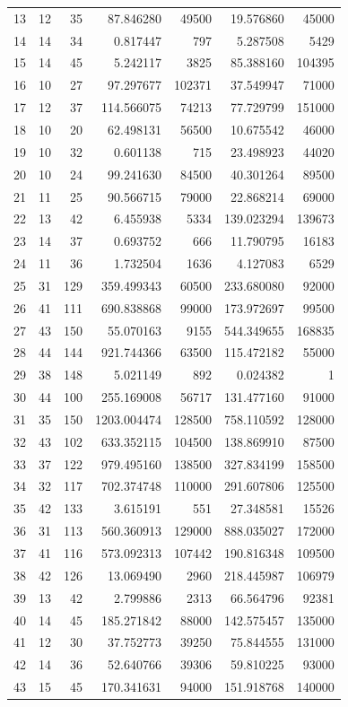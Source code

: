 \documentclass{article}
\begin{document}
\begin{landscape}
\begin{longtable}{rrrrrrr}
13 & 12 & 35 & 87.846280 & 49500 & 19.576860 & 45000 \\
14 & 14 & 34 & 0.817447 & 797 & 5.287508 & 5429 \\
15 & 14 & 45 & 5.242117 & 3825 & 85.388160 & 104395 \\
16 & 10 & 27 & 97.297677 & 102371 & 37.549947 & 71000 \\
17 & 12 & 37 & 114.566075 & 74213 & 77.729799 & 151000 \\
18 & 10 & 20 & 62.498131 & 56500 & 10.675542 & 46000 \\
19 & 10 & 32 & 0.601138 & 715 & 23.498923 & 44020 \\
20 & 10 & 24 & 99.241630 & 84500 & 40.301264 & 89500 \\
21 & 11 & 25 & 90.566715 & 79000 & 22.868214 & 69000 \\
22 & 13 & 42 & 6.455938 & 5334 & 139.023294 & 139673 \\
23 & 14 & 37 & 0.693752 & 666 & 11.790795 & 16183 \\
24 & 11 & 36 & 1.732504 & 1636 & 4.127083 & 6529 \\
25 & 31 & 129 & 359.499343 & 60500 & 233.680080 & 92000 \\
26 & 41 & 111 & 690.838868 & 99000 & 173.972697 & 99500 \\
27 & 43 & 150 & 55.070163 & 9155 & 544.349655 & 168835 \\
28 & 44 & 144 & 921.744366 & 63500 & 115.472182 & 55000 \\
29 & 38 & 148 & 5.021149 & 892 & 0.024382 & 1 \\
30 & 44 & 100 & 255.169008 & 56717 & 131.477160 & 91000 \\
31 & 35 & 150 & 1203.004474 & 128500 & 758.110592 & 128000 \\
32 & 43 & 102 & 633.352115 & 104500 & 138.869910 & 87500 \\
33 & 37 & 122 & 979.495160 & 138500 & 327.834199 & 158500 \\
34 & 32 & 117 & 702.374748 & 110000 & 291.607806 & 125500 \\
35 & 42 & 133 & 3.615191 & 551 & 27.348581 & 15526 \\
36 & 31 & 113 & 560.360913 & 129000 & 888.035027 & 172000 \\
37 & 41 & 116 & 573.092313 & 107442 & 190.816348 & 109500 \\
38 & 42 & 126 & 13.069490 & 2960 & 218.445987 & 106979 \\
39 & 13 & 42 & 2.799886 & 2313 & 66.564796 & 92381 \\
40 & 14 & 45 & 185.271842 & 88000 & 142.575457 & 135000 \\
41 & 12 & 30 & 37.752773 & 39250 & 75.844555 & 131000 \\
42 & 14 & 36 & 52.640766 & 39306 & 59.810225 & 93000 \\
43 & 15 & 45 & 170.341631 & 94000 & 151.918768 & 140000 \\
\end{longtable}


\end{landscape}
\end{document}
